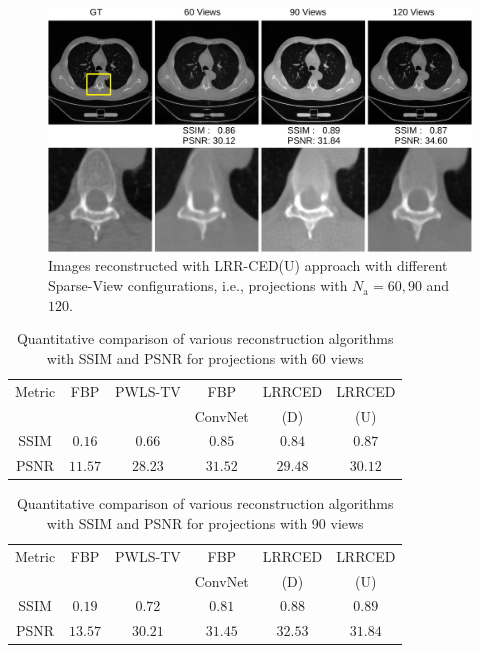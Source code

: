 \begin{figure}[!htbp]
	\centering
	\includegraphics[width=0.8\linewidth]{./Figures/views_unet-crop.pdf}
	\caption{Images reconstructed with LRR-CED(U) approach with different Sparse-View configurations, i.e., projections with $N_\mathrm{a}=60,90$ and $120$.}
	\label{fig:u_ang}
\end{figure}


\begin{table}[ht!]
	\centering
	\caption{Quantitative comparison of various reconstruction algorithms with \ac{SSIM} and \ac{PSNR} for projections with 60 views}
	\label{table:3a}
	\begin{tabular}{||c|c|c|c|c|c||} 
		\hline
		Metric & FBP & PWLS-TV & FBP & \ac{LRRCED} & \ac{LRRCED}  \\ %
		&     &         & ConvNet & (D) & (U) \\
		\hline\hline
		SSIM & $0.16$ & $0.66$ & $0.85$ & $0.84$ & $0.87$ \\ 
		PSNR & $11.57$ & $28.23$ & $31.52$ & $29.48$ & $30.12$ \\   
		\hline  
		
		\hline  
	\end{tabular}
	
\end{table}

\begin{table}[ht!]
	\centering
	\caption{Quantitative comparison of various reconstruction algorithms with \ac{SSIM} and \ac{PSNR} for projections with 90 views}
	\label{table:4a}
	\begin{tabular}{||c|c|c|c|c|c||} 
		\hline
		Metric & FBP & PWLS-TV & FBP & \ac{LRRCED} & \ac{LRRCED}  \\ %
		&     &         & ConvNet & (D) & (U) \\
		\hline\hline
		SSIM & $0.19$ & $0.72$ & $0.81$ & $0.88$ & $0.89$ \\ 
		PSNR & $13.57$ & $30.21$ & $31.45$ & $32.53$ & $31.84$ \\   
		\hline  
		
		\hline  
	\end{tabular}
	
\end{table}



